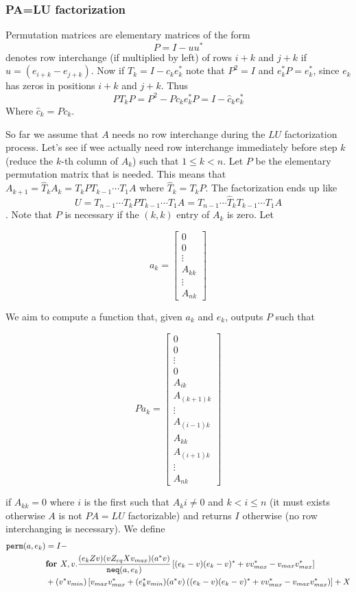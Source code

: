 \subsubsection{PA=LU factorization}

Permutation matrices are elementary matrices of the form $$P=I-uu^*$$ denotes row interchange (if multiplied by left) of rows $i+k$ and $j+k$ if $u=(e_{i+k}-e_{j+k})$. Now if $T_{k} = I-c_ke_k^*$ note that $P^2=I$ and $e_k^*P=e_k^*$, since $e_{k}$ has zeros in positions $i+k$ and $j+k$. Thus $$PT_kP=P^2-Pc_ke_k^*P=I-\widehat{c}_ke_k^*$$ Where $\widehat{c}_k=Pc_k$.

So far we assume that $A$ needs no row interchange during the $LU$ factorization process. Let's see if wee actually need row interchange immediately before step $k$ (reduce the $k$-th column of $A_{k}$) such that $1 \leq k < n$. Let $P$ be the elementary permutation matrix that is needed. This means that $A_{k+1}=\widehat{T}_kA_k=T_kPT_{k-1}\cdots T_1A$ where $\widehat{T}_k=T_{k}P$. The factorization ends up like $$U=T_{n-1}\cdots T_{k}PT_{k-1}\cdots T_1A = T_{n-1}\cdots \widehat{T}_{k}T_{k-1}\cdots T_1A$$. Note that $P$ is necessary if the $(k,k)$ entry of $A_{k}$ is zero. Let 

\[
a_k = 
\begin{bmatrix}
    0 \\
    0 \\
    \vdots \\
    A_{kk} \\
     \vdots \\
    A_{nk}
\end{bmatrix}
\]

We aim to compute a function that, given $a_k$ and $e_k$, outputs $P$ such that

\[
Pa_k = 
\begin{bmatrix}
    0 \\
    0 \\
    \vdots \\
    0 \\
    A_{ik} \\
    A_{(k+1)k}\\
    \vdots \\
    A_{(i-1)k} \\
    A_{kk} \\
    A_{(i+1)k} \\
    \vdots \\
    A_{nk}
\end{bmatrix}
\]

if $A_{kk}=0$ where $i$ is the first such that $A_ki\neq 0$ and $k<i\leq n$ (it must exists otherwise $A$ is not $PA=LU$ factorizable) and returns $I$ otherwise (no row interchanging is necessary). We define
\begin{align*}
\texttt{perm}(a,e_k)&=I - \\
 &\textbf{for } X,v. \dfrac{(e_kZv)(vZ_{eq}Xv_{max})(a^*v)}{\texttt{neq}(a, e_k)}\left[ (e_k-v)(e_k-v)^*+vv_{max}^*-v_{max}v_{max}^*\right] \\
 & + (v^*v_{min})\left[  v_{max}v_{max}^* + (e_k^*v_{min})(a^*v)\left( (e_k-v)(e_k-v)^* + vv_{max}^* - v_{max}v_{max}^* \right) \right] + X
\end{align*}

